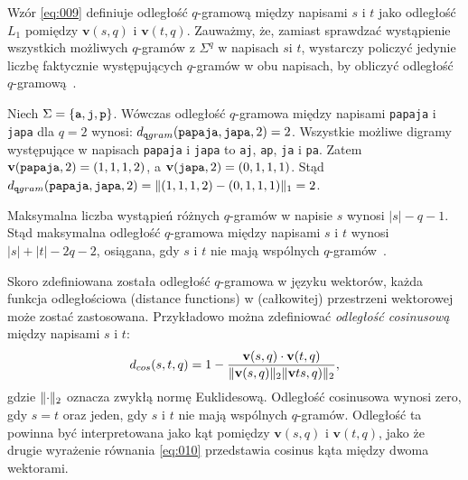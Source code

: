 \documentclass{praca1}
\DeclarePairedDelimiter{\norm}{\lVert}{\rVert}
\begin{document}
Wzór \ref{eq:009} definiuje odległość $q$-gramową między napisami $s$ i $t$ jako odległość $L_1$ pomiędzy $\mathbf{v}(s,q)$ i $\mathbf{v}(t,q)$. Zauważmy, że, zamiast sprawdzać wystąpienie wszystkich możliwych $q$-gramów z $\Sigma^q$ w napisach $s$i $t$, wystarczy policzyć jedynie liczbę faktycznie występujących $q$-gramów w obu napisach, by obliczyć odległość $q$-gramową~\cite{Loo2014:stringdist}.

\begin{example}
\label{ex:001}
Niech $\Sigma = \{\verb|a|, \verb|j|, \verb|p|\}$. Wówczas odległość $q$-gramowa między napisami \verb|papaja| i \verb|japa| dla $q = 2$ wynosi: $d_{\mathtt{q}gram}(\verb|papaja|, \verb|japa|, 2) = 2$. Wszystkie możliwe digramy występujące w napisach  \verb|papaja| i \verb|japa| to \verb|aj|, \verb|ap|, \verb|ja| i \verb|pa|. Zatem $\mathbf{v}( \verb|papaja|,2) = (1, 1, 1, 2)$, a  $\mathbf{v}( \verb|japa|,2) = (0, 1, 1, 1)$. Stąd $d_{\mathtt{q}gram}(\verb|papaja|, \verb|japa|, 2) =  \norm{(1,1,1,2) - (0,1,1,1)}_1 = 2$.
\end{example}


Maksymalna liczba wystąpień różnych $q$-gramów w napisie $s$ wynosi $|s| - q - 1$. Stąd maksymalna odległość $q$-gramowa między napisami $s$ i $t$ wynosi $|s| + |t| - 2q - 2$, osiągana, gdy $s$ i $t$ nie mają wspólnych $q$-gramów~\cite{Loo2014:stringdist}.

Skoro zdefiniowana została odległość $q$-gramowa w języku wektorów, każda funkcja odległościowa (distance functions) w (całkowitej) przestrzeni wektorowej może zostać zastosowana. Przykładowo można zdefiniować \emph{odległość cosinusową} między napisami $s$ i $t$:
\begin{equation}
\label{eq:010}
d_{cos}(s,t,q) = 1 - \frac{ \mathbf{v}(s,q) \cdot \mathbf{v}(t,q) }{ \norm{\mathbf{v}(s,q)}_2  \norm{\mathbf{v}ts,q)}_2 },
\end{equation}
gdzie $\norm{\cdot}_2$ oznacza zwykłą normę Euklidesową. Odległość cosinusowa wynosi zero, gdy $s=t$ oraz jeden, gdy $s$ i $t$ nie mają wspólnych $q$-gramów. Odległość ta powinna być interpretowana jako kąt pomiędzy $\mathbf{v}(s,q)$ i $\mathbf{v}(t,q)$, jako że drugie wyrażenie równania \ref{eq:010} przedstawia cosinus kąta między dwoma wektorami.
\end{document}
